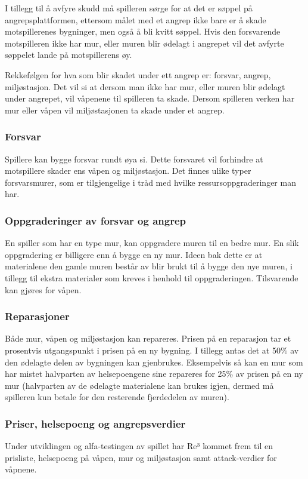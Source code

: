 I tillegg til å avfyre skudd må spilleren sørge for at det er søppel på angrepsplattformen, ettersom målet med et angrep ikke bare er å skade motspillerenes bygninger, men også å bli kvitt søppel. Hvis den forsvarende motspilleren ikke har mur, eller muren blir ødelagt i angrepet vil det avfyrte søppelet lande på motspillerens øy.

Rekkefølgen for hva som blir skadet under ett angrep er: forsvar, angrep, miljøstasjon. Det vil si at dersom man ikke har mur, eller muren blir ødelagt under angrepet, vil våpenene til spilleren ta skade. Dersom spilleren verken har mur eller våpen vil miljøstasjonen ta skade under et angrep. 


\subsubsection{Forsvar}
Spillere kan bygge forsvar rundt øya si. Dette forsvaret vil forhindre at motspillere skader ens våpen og miljøstasjon. Det finnes ulike typer forsvarsmurer, som er tilgjengelige i tråd med hvilke ressursoppgraderinger man har. 


\subsubsection{Oppgraderinger av forsvar og angrep}
En spiller som har en type mur, kan oppgradere muren til en bedre mur. En slik oppgradering er billigere enn å bygge en ny mur. Ideen bak dette er at materialene den gamle muren består av blir brukt til å bygge den nye muren, i tillegg til ekstra materialer som kreves i henhold til oppgraderingen. Tilsvarende kan gjøres for våpen.


\subsubsection{Reparasjoner}
Både mur, våpen og miljøstasjon kan repareres. Prisen på en reparasjon tar et prosentvis utgangspunkt i prisen på en ny bygning. I tillegg antas det at 50\% av den ødelagte delen av bygningen kan gjenbrukes. Eksempelvis så kan en mur som har mistet halvparten av helsepoengene sine repareres for 25\% av prisen på en ny mur (halvparten av de ødelagte materialene kan brukes igjen, dermed må spilleren kun betale for den resterende fjerdedelen av muren).


\subsubsection{Priser, helsepoeng og angrepsverdier}
Under utviklingen og alfa-testingen av spillet har Re³ kommet frem til en prisliste, helsepoeng på våpen, mur og miljøstasjon samt attack-verdier for våpnene.

